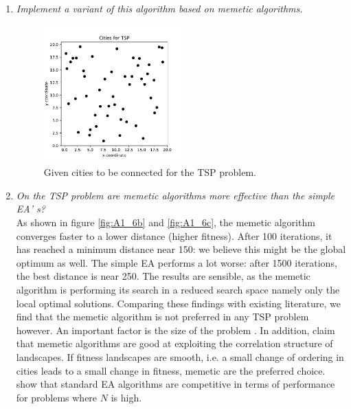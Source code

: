 \documentclass{article}
\begin{document}
\begin{enumerate}[label=\alph*)]
    \item \textit{Implement a variant of this algorithm based on memetic algorithms.} \\
    
    \begin{figure}[H]
        \centering
        \includegraphics[width=0.5\textwidth]{Assignment 1/Figures/A1_6a.pdf}
        \caption{Given cities to be connected for the TSP problem.}
        \label{fig:A1_6a}
    \end{figure}

    \item \textit{On the TSP problem are memetic algorithms more effective than the simple EA’ s? } \\
    As shown in figure \ref{fig:A1_6b} and \ref{fig:A1_6c}, the memetic algorithm converges faster to a lower distance (higher fitness). After 100 iterations, it has reached a minimum distance near 150: we believe this might be the global optimum as well. The simple EA performs a lot worse: after 1500 iterations, the best distance is near 250. The results are sensible, as the memetic algorithm is performing its search in a reduced search space namely only the local optimal solutions.  Comparing these findings with existing literature, we find that the memetic algorithm is not preferred in any TSP problem however. An important factor is the size of the problem  \cite{merz2001memetic}. In addition, \cite{merz2001memetic} claim that memetic algorithms are good at exploiting the correlation structure of landscapes. If fitness landscapes are smooth, i.e. a small change of ordering in cities leads to a small change in fitness, memetic are the preferred choice.
     show that standard EA algorithms are competitive in terms of performance for problems where $N$ is high. 
\end{enumerate}
\end{document}
